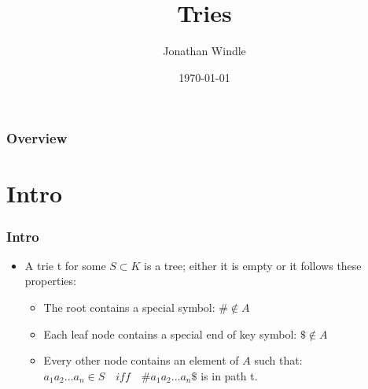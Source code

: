 \documentclass{beamer}
\title[Tries]{Tries} %
\author{Jonathan Windle} %
\institute[UEA] %
{
University of East Anglia \\ %
\medskip
\textit{J.Windle@uea.ac.uk} %
}
\date{\today} %
\begin{document}
\begin{frame}
\titlepage %
\end{frame}

\begin{frame}[allowframebreaks]
\frametitle{Overview} %
\tableofcontents %
\end{frame}

\section{Intro}
\begin{frame}
\frametitle{Intro}
\begin{itemize}
\item A {\color{red}trie} t for some $S \subset K$ is a tree; either it is empty or it follows these properties:
\begin{itemize}
\item The root contains a special symbol: $\# \notin A$ 
\item Each leaf node contains a special end of key symbol: $\$ \notin A$
\item Every other node contains an element of $A$ such that:\\
$a_1a_2...a_n \in S\quad iff\quad \#a_1a_2...a_n\$$ is in path t.
\end{itemize}
\end{itemize}
\end{frame}
\end{document}
